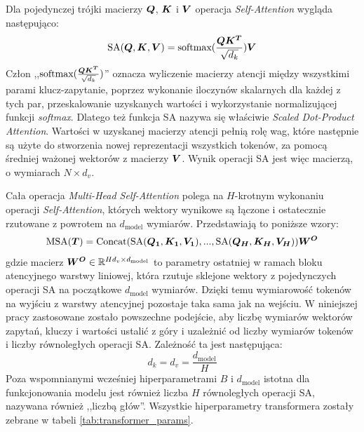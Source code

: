 Dla pojedynczej trójki macierzy $\boldsymbol{Q}$, $\boldsymbol{K}$ i $\boldsymbol{V}$ operacja
\emph{Self-Attention} wygląda następująco:
\begin{equation} \label{eq:sa}
    \textrm{SA}(\boldsymbol{Q}, \boldsymbol{K}, \boldsymbol{V}) = \textrm{softmax}(\frac{\boldsymbol{Q}\boldsymbol{K^T}}{\sqrt{d_k}})\boldsymbol{V}
\end{equation}
Człon ,,$\textrm{softmax}(\frac{\boldsymbol{Q}\boldsymbol{K^T}}{\sqrt{d_k}})$'' oznacza wyliczenie macierzy
atencji między wszystkimi parami klucz-zapytanie, poprzez wykonanie iloczynów skalarnych dla
każdej z tych par, przeskalowanie uzyskanych wartości i wykorzystanie normalizującej funkcji
\emph{softmax}. Dlatego też funkcja SA nazywa się właściwie \emph{Scaled Dot-Product Attention}.
Wartości w uzyskanej macierzy atencji pełnią rolę wag, które następnie są użyte do stworzenia
nowej reprezentacji wszystkich tokenów, za pomocą średniej ważonej wektorów z macierzy $\boldsymbol{V}$.
Wynik operacji SA jest więc macierzą, o wymiarach $N \times d_v$.

Cała operacja \emph{Multi-Head Self-Attention} polega na $H$-krotnym wykonaniu operacji
\emph{Self-Attention}, których wektory wynikowe są łączone i ostatecznie rzutowane z powrotem na
$d_{\mathrm{model}}$ wymiarów. Przedstawiają to poniższe wzory:
\begin{equation}
    \textrm{MSA}(\boldsymbol{T}) = \textrm{Concat}(\textrm{SA}(\boldsymbol{Q_1}, \boldsymbol{K_1}, \boldsymbol{V_1}), ..., \textrm{SA}(\boldsymbol{Q_H},
    \boldsymbol{K_H}, \boldsymbol{V_H}))\boldsymbol{W^O}
\end{equation}
gdzie macierz $\boldsymbol{W^O} \in \mathbb{R}^{Hd_v \times d_{\mathrm{model}}}$ to parametry ostatniej w ramach bloku
atencyjnego warstwy liniowej, która rzutuje sklejone wektory z pojedynczych operacji SA na
początkowe $d_{\mathrm{model}}$ wymiarów. Dzięki temu wymiarowość tokenów na wyjściu z warstwy
atencyjnej pozostaje taka sama jak na wejściu. W niniejszej pracy zastosowane zostało powszechne
podejście, aby liczbę wymiarów wektorów zapytań, kluczy i wartości ustalić z góry i uzależnić od
liczby wymiarów tokenów i liczby równoległych operacji SA. Zależność ta jest następująca:
\begin{equation}
    d_k = d_v = \frac{d_{\mathrm{model}}}{H}
\end{equation}
Poza wspomnianymi wcześniej hiperparametrami $B$ i $d_{\mathrm{model}}$ istotna dla funkcjonowania
modelu jest również liczba $H$ równoległych operacji SA, nazywana również ,,liczbą głów''. Wszystkie
hiperparametry transformera zostały zebrane w tabeli \ref{tab:transformer_params}.

